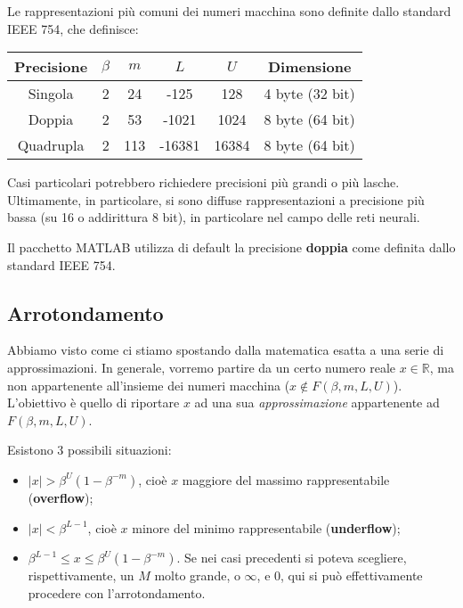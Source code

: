 \documentclass[a4paper,11pt]{article}
\begin{document}
Le rappresentazioni più comuni dei numeri macchina sono definite dallo standard IEEE 754, che definisce:

\begin{table}[h!]
	\center {}
	\begin{tabular} { c | c | c | c | c | c }
		\bfseries Precisione & \bfseries $\beta$ & \bfseries $m$ & \bfseries $L$ & \bfseries $U$ & \bfseries Dimensione \\ 
		\hline
		Singola & 2 & 24 & -125 & 128 & 4 byte (32 bit) \\ 
		Doppia & 2 & 53 & -1021 & 1024 & 8 byte (64 bit) \\ 
		Quadrupla & 2 & 113 & -16381 & 16384 & 8 byte (64 bit) \\ 
	\end{tabular}
\end{table}

Casi particolari potrebbero richiedere precisioni più grandi o più lasche.
Ultimamente, in particolare, si sono diffuse rappresentazioni a precisione più bassa (su 16 o addirittura 8 bit), in particolare nel campo delle reti neurali.

Il pacchetto MATLAB utilizza di default la precisione \textbf{doppia} come definita dallo standard IEEE 754.

\subsection{Arrotondamento}
Abbiamo visto come ci stiamo spostando dalla matematica esatta a una serie di approssimazioni.
In generale, vorremo partire da un certo numero reale $x \in \mathbb{R}$, ma non appartenente all'insieme dei numeri macchina ($x \not \in F(\beta, m, L ,U)$).
L'obiettivo è quello di riportare $x$ ad una sua \textit{approssimazione} appartenente ad $F(\beta, m, L, U)$.

Esistono 3 possibili situazioni:
\begin{itemize}
	\item $|x| > \beta^U (1 - \beta^{-m})$, cioè $x$ maggiore del massimo rappresentabile (\textbf{overflow});
	\item $|x| < \beta^{L - 1}$, cioè $x$ minore del minimo rappresentabile (\textbf{underflow});
	\item $\beta^{L - 1} \leq x \leq \beta^U (1 - \beta^{-m})$. Se nei casi precedenti si poteva scegliere, rispettivamente, un $M$ molto grande, o  $\infty$, e $0$, qui si può effettivamente procedere con l'arrotondamento.
\end{itemize}
\end{document}
